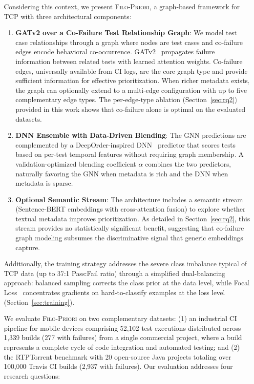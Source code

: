\documentclass[10pt,journal,compsoc]{IEEEtran}
\newcommand{\filopriori}{\textsc{Filo-Priori}}
\begin{document}
Considering this context, we present
\filopriori{}, a graph-based framework for TCP with three architectural
components:

\begin{enumerate}
    \item \textbf{GATv2 over a Co-Failure Test Relationship Graph}: We model
    test case relationships through a graph where nodes are test cases and
    co-failure edges encode behavioral co-occurrence.
    GATv2~\cite{brody2022attentive} propagates failure information between related
    tests with learned attention weights. Co-failure edges, universally
    available from CI logs, are the core graph type and provide sufficient
    information for effective prioritization. When richer metadata exists, the
    graph can optionally extend to a multi-edge configuration with up to five
    complementary edge types. The per-edge-type
    ablation (Section~\ref{sec:rq2}) provided in this work shows that co-failure alone is optimal on the
    evaluated datasets.

    \item \textbf{DNN Ensemble with Data-Driven Blending}: The GNN predictions
    are complemented by a DeepOrder-inspired DNN~\cite{chen2023deeporder}
    predictor that scores tests based on per-test temporal features without
    requiring graph membership. A validation-optimized blending coefficient
    $\alpha$ combines the two predictors, naturally favoring the GNN when
    metadata is rich and the DNN when metadata is sparse.

    \item \textbf{Optional Semantic Stream}: The architecture includes
    a semantic stream (Sentence-BERT embeddings with cross-attention fusion)
    to explore whether textual metadata improves prioritization.
    As detailed in Section~\ref{sec:rq2}, this stream provides no
    statistically significant benefit, suggesting that co-failure graph
    modeling subsumes the discriminative signal that generic embeddings
    capture.
\end{enumerate}

Additionally, the training strategy addresses the severe class imbalance
typical of TCP data (up to 37:1 Pass:Fail ratio) through a simplified
dual-balancing approach: balanced sampling corrects the class prior at the
data level, while Focal Loss~\cite{lin2017focal} concentrates gradients on
hard-to-classify examples at the loss level
(Section~\ref{sec:training}).

We evaluate \filopriori{} on two complementary datasets: (1) an industrial
CI pipeline for mobile devices comprising 52,102 test executions
distributed across 1,339 builds (277 with failures) from a single
commercial project, where a build represents a complete cycle of code
integration and automated testing; and (2) the RTPTorrent benchmark with
20 open-source Java projects totaling over 100,000 Travis CI builds
(2,937 with failures). Our evaluation addresses four research questions:
\end{document}
